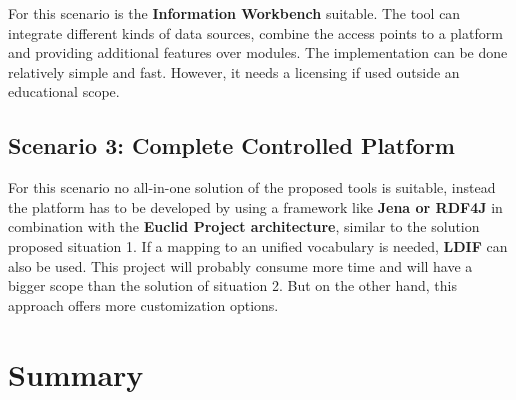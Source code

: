 For this scenario is the \textbf{Information Workbench} suitable. The tool can 
integrate different kinds of data sources, combine the access points to a platform 
and providing additional features over modules. The implementation can be done 
relatively simple and fast. However, it needs a licensing if used outside an 
educational scope.

\subsection{Scenario 3: Complete Controlled Platform}

For this scenario no all-in-one solution of the proposed tools is suitable, 
instead the platform has to be developed by using a framework like \textbf{Jena or 
RDF4J} in combination with the \textbf{Euclid Project architecture}, similar to 
the solution proposed situation 1. If a mapping to an unified vocabulary is 
needed, \textbf{LDIF} can also be used. This project will probably consume more 
time and will have a bigger scope than the solution of situation 2. But on the 
other hand, this approach offers more customization options.

\section{Summary}

